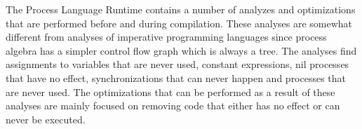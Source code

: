 	The Process Language Runtime contains a number of analyzes and optimizations 
	that are performed before and during compilation. These analyses are 
	somewhat different from analyses of imperative programming languages since 
	process algebra has a simpler control flow graph which is always a tree. The 
	analyses find assignments to variables that are never used, constant 
	expressions, nil processes that have no effect, synchronizations that can 
	never happen and processes that are never used. The optimizations that can 
	be performed as a result of these analyses are mainly focused on removing 
	code that either has no effect or can never be executed. 